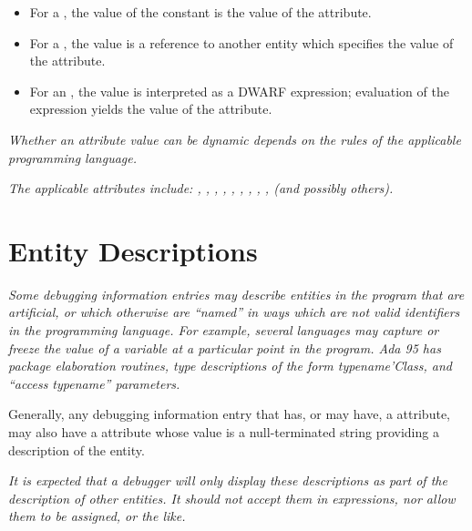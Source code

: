 \begin{itemize}
\item For a , the value of the constant is the value of
the attribute.

\item For a , the
value is a reference to another
entity which specifies the value of the attribute.

\item For an , the value is interpreted as a 
DWARF expression; 
evaluation of the expression yields the value of
the attribute.
\end{itemize}

\textit{
Whether an attribute value can be dynamic depends on the
rules of the applicable programming language.
}

\textit{The applicable attributes include: 
,
, 
, 
,
, 
, 
,
, 
, 
 (and
possibly others).}


\section{Entity Descriptions}
\textit{Some debugging information entries may describe entities
in the program that are artificial, or which otherwise are
``named'' in ways which are not valid identifiers in the
programming language. For example, several languages may
capture or freeze the value of a variable at a particular
point in the program. Ada 95 has package elaboration routines,
type descriptions of the form typename’Class, and 
``access typename'' parameters.  }

Generally, any debugging information
entry that has, or may have, a  attribute, may
also have a  attribute whose value is a
null-terminated string providing a description of the entity.


\textit{It is expected that a debugger will only display these
descriptions as part of the description of other entities. It
should not accept them in expressions, nor allow them to be
assigned, or the like.}

